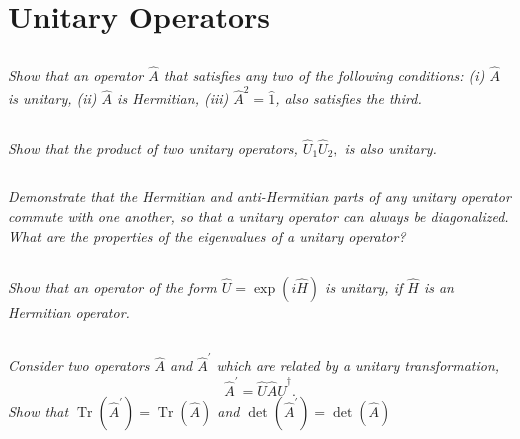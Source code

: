 \documentclass[12pt, letterpaper]{article}
\begin{document}
\section{Unitary Operators}
\subsection{}
\textit{Show that an operator $\hat{A}$ that satisfies any two of the following conditions: (i) $\hat{A}$ is unitary, (ii) $\hat{A}$ is Hermitian, (iii) $\hat{A}^2 =\hat{1}$, also satisfies the third. }
\subsection{}
\textit{Show that the product of two unitary operators, $\hat{U}_{1} \hat{U}_{2},$ is also unitary.}
\subsection{}
\textit{Demonstrate that the Hermitian and anti-Hermitian parts of any unitary operator commute with one another, so that a unitary operator can always be diagonalized. What are the properties of the eigenvalues of a unitary operator?}
\subsection{}
\textit{Show that an operator of the form $\hat{U}=\exp (i \hat{H})$ is unitary, if $\hat{H}$ is an Hermitian operator.}
\subsection{}
\textit{Consider two operators $\hat{A}$ and $\hat{A}^{\prime}$ which are related by a unitary transformation,} 
$$
\hat{A}^{\prime}=\hat{U} \hat{A} \hat{U}^{\dagger}.
$$
\textit{Show that $\operatorname{Tr}\left(\hat{A}^{\prime}\right)=\operatorname{Tr}(\hat{A})$ and $\operatorname{det}\left(\hat{A}^{\prime}\right)=\operatorname{det}(\hat{A})$}
\end{document}
